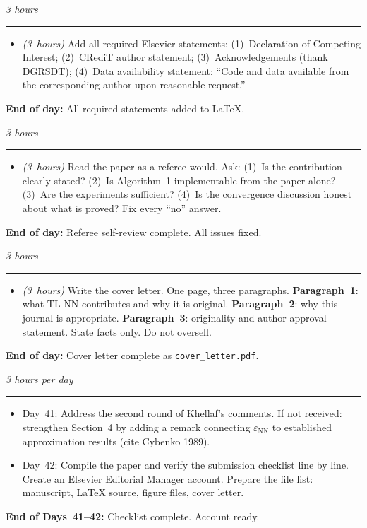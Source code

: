 \documentclass[12pt,a4paper]{article}
\newcommand{\hrs}[1]{\textit{\color{darkgray}(#1~hours)}}
\newcommand{\dayheading}[2]{%
  \vspace{0.3em}
  \noindent{\bfseries\color{darkblue}Day~#1}%
  \hfill{\small\color{darkgray}\textit{#2}}%
  \\[-0.4em]{\color{midgray}\rule{\linewidth}{0.4pt}}%
  \vspace{0.1em}
}
\begin{document}
\begin{tcolorbox}[daystyle]
\dayheading{38}{3 hours}
\begin{itemize}[leftmargin=1.8em,itemsep=3pt]
  \item[\color{midblue}$\bullet$]
    \hrs{3} Add all required Elsevier statements:
    (1)~Declaration of Competing Interest;
    (2)~CRediT author statement;
    (3)~Acknowledgements (thank DGRSDT);
    (4)~Data availability statement:
    ``Code and data available from the corresponding
    author upon reasonable request.''
\end{itemize}
\noindent\textbf{End of day:}
All required statements added to \LaTeX.
\end{tcolorbox}

\begin{tcolorbox}[daystyle]
\dayheading{39}{3 hours}
\begin{itemize}[leftmargin=1.8em,itemsep=3pt]
  \item[\color{midblue}$\bullet$]
    \hrs{3} Read the paper as a referee would. Ask:
    (1)~Is the contribution clearly stated?
    (2)~Is Algorithm~1 implementable from the paper alone?
    (3)~Are the experiments sufficient?
    (4)~Is the convergence discussion honest about what
    is proved? Fix every ``no'' answer.
\end{itemize}
\noindent\textbf{End of day:}
Referee self-review complete. All issues fixed.
\end{tcolorbox}

\begin{tcolorbox}[daystyle]
\dayheading{40}{3 hours}
\begin{itemize}[leftmargin=1.8em,itemsep=3pt]
  \item[\color{midblue}$\bullet$]
    \hrs{3} Write the cover letter. One page, three
    paragraphs. \textbf{Paragraph~1}: what TL-NN
    contributes and why it is original. \textbf{Paragraph~2}:
    why this journal is appropriate. \textbf{Paragraph~3}:
    originality and author approval statement.
    State facts only. Do not oversell.
\end{itemize}
\noindent\textbf{End of day:}
Cover letter complete as \texttt{cover\_letter.pdf}.
\end{tcolorbox}

\begin{tcolorbox}[daystyle]
\dayheading{41--42}{3 hours per day}
\begin{itemize}[leftmargin=1.8em,itemsep=3pt]
  \item[\color{midblue}$\bullet$]
    Day~41: Address the second round of Khellaf's comments.
    If not received: strengthen Section~4 by adding a
    remark connecting $\varepsilon_{\mathrm{NN}}$ to
    established approximation results
    (cite Cybenko 1989).
  \item[\color{midblue}$\bullet$]
    Day~42: Compile the paper and verify the submission
    checklist line by line. Create an Elsevier Editorial
    Manager account. Prepare the file list: manuscript,
    \LaTeX{} source, figure files, cover letter.
\end{itemize}
\noindent\textbf{End of Days~41--42:}
Checklist complete. Account ready.
\end{tcolorbox}
\end{document}
